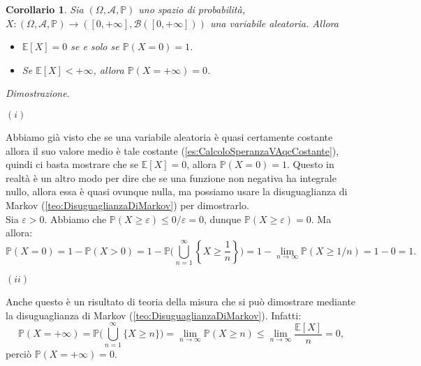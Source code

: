\documentclass[11pt]{book}
\makeatletter
\theoremstyle{Definizione}
\theoremstyle{TeoremaProposizioneLemmaCorollario}
\newtheorem{mycor}[myteo]{Corollario}
\theoremstyle{OsservazioneNota}
\renewenvironment{proof}[1][\proofname]{\par
  \normalfont \topsep6\p@\@plus6\p@\relax
  \trivlist
  \item[\hskip\labelsep
        \itshape
    #1\@addpunct{.}]\ignorespaces
}{%
  \endtrivlist\@endpefalse
}
\renewcommand{\P}{\mathbb{P}}
\newcommand{\E}{\mathbb{E}}
\renewenvironment{proof}{\textsl{Dimostrazione}.}{}
\makeatother
\begin{document}
\begin{boxoss}
\begin{mycor}
Sia $(\Omega,\mathcal{A},\P)$ uno spazio di probabilità, $X:(\Omega,\mathcal{A},\P) \longrightarrow ([0,+\infty],\mathcal{B}([0,+\infty]))$ una variabile aleatoria. Allora
\begin{itemize}
\item[$(i)$] $\E[X] = 0$ se e solo se $\P(X = 0) = 1$.
\item[$(ii)$] Se $\E[X]<+\infty$, allora $\P(X = +\infty) = 0$.
\end{itemize}
\end{mycor}
\tcblower
\begin{proof}
\hfill
\begin{flushleft}
$(i)$
\end{flushleft}
Abbiamo già visto che se una variabile aleatoria è quasi certamente costante allora il suo valore medio è tale costante (\ref{es:CalcoloSperanzaVAqcCostante}), quindi ci basta mostrare che se $\E[X] = 0$, allora $\P(X = 0) = 1$. Questo in realtà è un altro modo per dire che se una funzione non negativa ha integrale nullo, allora essa è quasi ovunque nulla, ma possiamo usare la disuguaglianza di Markov (\ref{teo:DisuguaglianzaDiMarkov}) per dimostrarlo.\\
Sia $\varepsilon > 0$. Abbiamo che $\P(X \geq \varepsilon) \leq 0/\varepsilon = 0$, dunque $\P(X \geq \varepsilon) = 0$. Ma allora:
$$
\P(X = 0) = 1- \P(X > 0) = 1-\P\Bigg(\bigcup_{n = 1}^\infty \left\{X \geq \frac{1}{n}\right\}\Bigg) = 1-\lim_{n \to \infty} \P(X \geq 1/n) = 1-0 = 1.
$$
\begin{flushleft}
$(ii)$
\end{flushleft}
Anche questo è un risultato di teoria della misura che si può dimostrare mediante la disuguaglianza di Markov (\ref{teo:DisuguaglianzaDiMarkov}). Infatti:
$$
\P(X = +\infty) = \P\Bigg(\bigcup_{n = 1}^\infty \{X \geq n\}\Bigg) = \lim_{n \to \infty} \P(X \geq n) \leq \lim_{n \to \infty} \frac{\E[X]}{n} = 0,
$$
perciò $\P(X = +\infty) = 0$.
\end{proof}
\end{boxoss}
\end{document}
